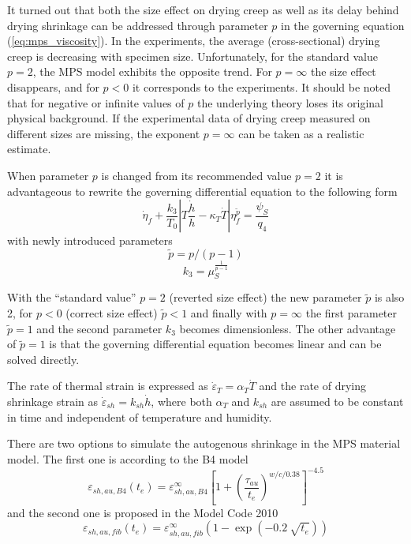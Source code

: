 \documentclass[a4paper]{article}
\begin{document}
It turned out that both the size effect on drying creep as well as its delay behind drying shrinkage can be addressed through parameter $p$ in the governing equation (\ref{eq:mps_viscosity}). In the experiments, the average (cross-sectional) drying creep is decreasing with specimen size. Unfortunately, for the standard value $p=2$, the MPS model exhibits the opposite trend. For $p = \infty$ the size effect disappears, and for $p < 0$ it corresponds to the experiments. It should be noted that for negative or infinite values of $p$ the underlying theory loses its original physical background. 
If the experimental data of drying creep measured on different sizes
are missing, the exponent $p = \infty$ can be taken as a realistic
estimate.  

When parameter $p$ is changed from its recommended value $p = 2$ it is advantageous to rewrite the governing differential equation to the following form
%
\begin{equation}
{\dot \eta_f + \frac{k_3}{T_0} \left| T \frac{\dot h}{h}  - \kappa_T  \dot T \right|  \eta_f^{\tilde{p}} = \frac{\psi_S}{q_4}}
\label{eq:mps_reformulate}
\end{equation}
%
with newly introduced parameters
%
\begin{equation}
\label{eq:mps_p}
\tilde{p} = p / (p-1)
\end{equation}
%
\begin{equation}
\label{eq:mps_k3}
k_3 = \mu_S^{\frac{1}{p-1}}
\end{equation}

With the ``standard value'' $p = 2$ (reverted size effect) the new
parameter $\tilde{p}$ is also 2, for $p < 0$ (correct size effect)
$\tilde{p} < 1$ and finally with $p = \infty$ the first parameter
$\tilde{p} = 1$ and the second parameter $k_3$ becomes
dimensionless. The other advantage of $\tilde{p} = 1$ is that the
governing differential equation becomes linear and can be solved
directly. 


The rate of thermal strain is expressed as $\dot{\varepsilon}_T = \alpha_T \dot{T}$ and the rate of drying shrinkage strain as $\dot{\varepsilon}_{sh} = k_{sh} \dot{h}$, where both $\alpha_T$ and $k_{sh}$ are assumed to be constant in time and independent of temperature and humidity. 

There are two options to simulate the autogenous shrinkage in the MPS material model. The first one is according to the B4 model 
\begin{equation}
\varepsilon_{sh,au,B4}(t_e) = \varepsilon_{sh,au,B4}^\infty \left[ 1 + \left( \frac{ \tau_{au} }{t_e} \right) ^ {w/c/0.38} \right]^{-4.5}
\label{eq:auto_shr_b4}
\end{equation}
and the second one is proposed in the Model Code 2010
\begin{equation}
\varepsilon_{sh,au,fib}(t_e) = \varepsilon_{sh,au,fib}^\infty \left( 1- \exp \left( -0.2 \: \sqrt{t_e} \right) \right)
\label{eq:auto_shr_fib}
\end{equation}
\end{document}
